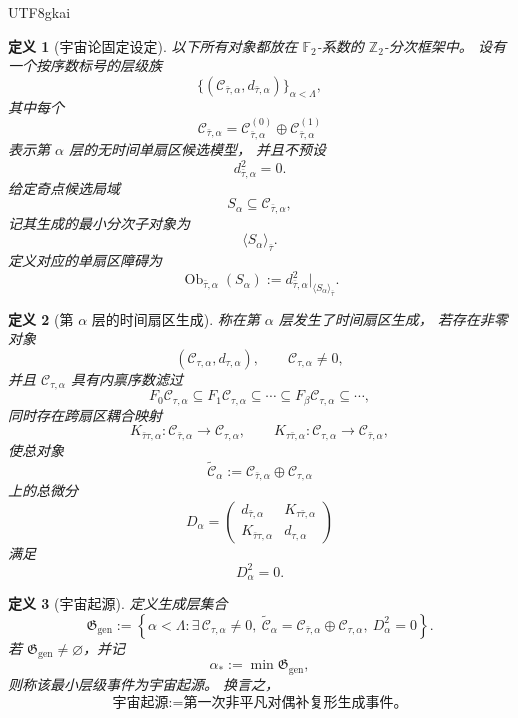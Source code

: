 \documentclass[12pt]{article}
\newtheorem{definition}{定义}[section]
\newcommand{\Ztwo}{\mathbb{Z}_2}
\newcommand{\Ftwo}{\mathbb{F}_2}
\begin{document}
\begin{CJK*}{UTF8}{gkai}
\begin{definition}[宇宙论固定设定]
\label{def:tex43-cosmology-fixed}
以下所有对象都放在 $\Ftwo$-系数的 $\Ztwo$-分次框架中。
设有一个按序数标号的层级族
\[
  \big\{(\mathcal C_{\bar\tau,\alpha},d_{\bar\tau,\alpha})\big\}_{\alpha<\Lambda},
\]
其中每个
\[
  \mathcal C_{\bar\tau,\alpha}
  =
  \mathcal C_{\bar\tau,\alpha}^{(0)}
  \oplus
  \mathcal C_{\bar\tau,\alpha}^{(1)}
\]
表示第 $\alpha$ 层的无时间单扇区候选模型，
并且不预设
\[
  d_{\bar\tau,\alpha}^2=0.
\]
给定奇点候选局域
\[
  S_\alpha\subseteq \mathcal C_{\bar\tau,\alpha},
\]
记其生成的最小分次子对象为
\[
  \langle S_\alpha\rangle_{\bar\tau}.
\]
定义对应的单扇区障碍为
\[
  \operatorname{Ob}_{\bar\tau,\alpha}(S_\alpha)
  :=
  d_{\bar\tau,\alpha}^2\big|_{\langle S_\alpha\rangle_{\bar\tau}}.
\]
\end{definition}

\begin{definition}[第 $\alpha$ 层的时间扇区生成]
\label{def:tex43-time-generation-alpha}
称在第 $\alpha$ 层发生了\emph{时间扇区生成}，
若存在非零对象
\[
  (\mathcal C_{\tau,\alpha},d_{\tau,\alpha}),
  \qquad
  \mathcal C_{\tau,\alpha}\neq 0,
\]
并且 $\mathcal C_{\tau,\alpha}$ 具有内禀序数滤过
\[
  F_0\mathcal C_{\tau,\alpha}\subseteq F_1\mathcal C_{\tau,\alpha}\subseteq \cdots \subseteq F_\beta\mathcal C_{\tau,
    \alpha}\subseteq \cdots,
\]
同时存在跨扇区耦合映射
\[
  K_{\bar\tau\tau,\alpha}:\mathcal C_{\bar\tau,\alpha}\to \mathcal C_{\tau,\alpha},
  \qquad
  K_{\tau\bar\tau,\alpha}:\mathcal C_{\tau,\alpha}\to \mathcal C_{\bar\tau,\alpha},
\]
使总对象
\[
  \widetilde{\mathcal C}_\alpha
  :=
  \mathcal C_{\bar\tau,\alpha}\oplus \mathcal C_{\tau,\alpha}
\]
上的总微分
\[
  D_\alpha=
  \begin{pmatrix}
    d_{\bar\tau,\alpha} & K_{\tau\bar\tau,\alpha}\\
    K_{\bar\tau\tau,\alpha} & d_{\tau,\alpha}
  \end{pmatrix}
\]
满足
\[
  D_\alpha^2=0.
\]
\end{definition}

\begin{definition}[宇宙起源]
\label{def:tex43-cosmological-origin}
定义生成层集合
\[
  \mathfrak G_{\mathrm{gen}}
  :=
  \left\{
    \alpha<\Lambda:
    \exists\,\mathcal C_{\tau,\alpha}\neq 0,\
    \widetilde{\mathcal C}_\alpha=
    \mathcal C_{\bar\tau,\alpha}\oplus \mathcal C_{\tau,\alpha},\
    D_\alpha^2=0
  \right\}.
\]
若 $\mathfrak G_{\mathrm{gen}}\neq \varnothing$，并记
\[
  \alpha_\ast:=\min \mathfrak G_{\mathrm{gen}},
\]
则称该最小层级事件为\emph{宇宙起源}。
换言之，
\[
  \boxed{
    \text{宇宙起源}
    :=
    \text{第一次非平凡对偶补复形生成事件。}
  }
\]
\end{definition}


\end{CJK*}
\end{document}
